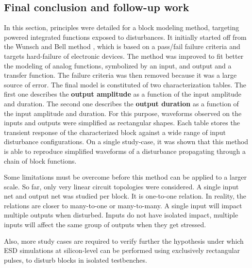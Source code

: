 \subsection{Final conclusion and follow-up work}
\label{sec:limits-block-cz-final}

In this section, principles were detailed for a block modeling method, targeting powered integrated functions exposed to disturbances.
It initially started off from the Wunsch and Bell method \cite{wunsch-bell}, which is based on a pass/fail failure criteria and targets hard-failure of electronic devices.
The method was improved to fit better the modeling of analog functions, symbolized by an input, and output and a transfer function.
The failure criteria was then removed because it was a large source of error.
The final model is constituted of two characterization tables.
The first one describes the \textbf{output amplitude} as a function of the input amplitude and duration.
The second one describes the \textbf{output duration} as a function of the input amplitude and duration.
For this purpose, waveforms observed on the inputs and outputs were simplified as rectangular shapes.
Each table stores the transient response of the characterized block against a wide range of input disturbance configurations.
On a single study-case, it was shown that this method is able to reproduce simplified waveforms of a disturbance propagating through a chain of block functions.

Some limitations must be overcome before this method can be applied to a larger scale.
So far, only very linear circuit topologies were considered.
A single input net and output net was studied per block.
It is one-to-one relation.
In reality, the relations are closer to many-to-one or many-to-many.
A single input will impact multiple outputs when disturbed.
Inputs do not have isolated impact, multiple inputs will affect the same group of outputs when they get stressed.

Also, more study cases are required to verify further the hypothesis under which ESD simulations at silicon-level can be performed using exclusively rectangular pulses, to disturb blocks in isolated testbenches.
